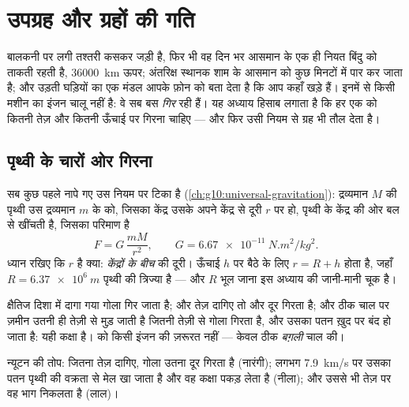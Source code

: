 \chapter{उपग्रह और ग्रहों की गति}\label{ch:g12:satellites-kepler}

बालकनी पर लगी तश्तरी कसकर जड़ी है, फिर भी वह दिन भर आसमान के एक ही नियत बिंदु
को ताकती रहती है, \qty{36000}{km} ऊपर; अंतरिक्ष स्थानक शाम के आसमान को कुछ मिनटों में
पार कर जाता है; और उड़ती घड़ियों का एक मंडल आपके फ़ोन को बता देता है कि आप कहाँ
खड़े हैं। इनमें से किसी मशीन का इंजन चालू नहीं है: वे सब बस \emph{गिर} रही
हैं। यह अध्याय हिसाब लगाता है कि हर एक को कितनी तेज़ और कितनी ऊँचाई पर गिरना
चाहिए --- और फिर उसी नियम से ग्रह भी तौल देता है।

\section{पृथ्वी के चारों ओर गिरना}

सब कुछ पहले नापे गए उस नियम पर टिका है (\cref{ch:g10:universal-gravitation}): द्रव्यमान $M$ की पृथ्वी उस
द्रव्यमान $m$ के  को, जिसका केंद्र उसके अपने केंद्र से दूरी
$r$ पर हो, पृथ्वी के केंद्र की ओर बल से खींचती है, जिसका परिमाण है
\[ F = G\,\frac{m M}{r^2}, \qquad G = \qty{6.67e-11}{N.m^2/kg^2}. \]
ध्यान रखिए कि $r$ है क्या: \emph{केंद्रों के बीच} की दूरी। ऊँचाई $h$ पर
बैठे  के लिए $r = R + h$ होता है, जहाँ $R = \qty{6.37e6}{m}$ पृथ्वी की त्रिज्या है
--- और $R$ भूल जाना इस अध्याय की जानी-मानी चूक है।

\begin{remark}[न्यूटन की तोप, फिर से]\label{rem:g12:satellites-kepler:cannon}
क्षैतिज दिशा में दागा गया गोला गिर जाता है; और तेज़ दागिए तो और दूर गिरता है;
और ठीक चाल पर ज़मीन उतनी ही तेज़ी से मुड़ जाती है जितनी तेज़ी से गोला गिरता है,
और उसका पतन ख़ुद पर बंद हो जाता है: यही कक्षा है।  को
किसी इंजन की ज़रूरत नहीं --- केवल ठीक \emph{बग़ली} चाल की।
\end{remark}

\begin{omfigure}

{\small न्यूटन की तोप: जितना तेज़ दागिए, गोला उतना दूर गिरता है (नारंगी);
लगभग \qty{7.9}{km/s} पर उसका पतन पृथ्वी की वक्रता से मेल खा जाता है और वह
कक्षा पकड़ लेता है (नीला); और उससे भी तेज़ पर वह भाग निकलता है (लाल)।}
\end{omfigure}

